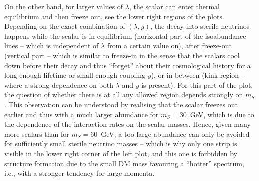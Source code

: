 On the other hand, for larger values of $\lambda$, the scalar can enter thermal equilibrium and then freeze out, see the lower right regions of the plots. Depending on the exact combination of $(\lambda, y)$, the decay into sterile neutrinos happens while the scalar is in equilibrium (horizontal part of the isoabundance-lines -- which is independent of $\lambda$ from a certain value on), after freeze-out (vertical part -- which is similar to freeze-in in the sense that the scalars cool down before their decay and thus ``forget'' about their cosmological history for a long enough lifetime or small enough coupling $y$), or in between (kink-region -- where a strong dependence on both $\lambda$ and $y$ is present). For this part of the plot, the question of whether there is at all any allowed region depends strongly on $m_S$. This observation can be understood by realising that the scalar freezes out earlier and thus with a much larger abundance for $m_S = 30$~GeV, which is due to the dependence of the interaction rates on the scalar masses. Hence, given many more scalars than for $m_S = 60$~GeV, a too large abundance can only be avoided for sufficiently small sterile neutrino masses -- which is why only one strip is visible in the lower right corner of the left plot, and this one is forbidden by structure formation due to the small DM mass favouring a ``hotter'' spectrum, i.e., with a stronger tendency for large momenta.

